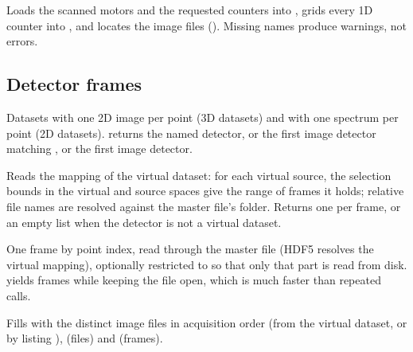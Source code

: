 Loads the scanned motors and the requested counters into , grids every 1D
counter into , and locates the image files (). Missing names
produce warnings, not errors.

\subsection{Detector frames}

Datasets with one 2D image per point (3D datasets) and with one spectrum per point (2D
datasets).  returns the named detector, or the first image detector
matching , or the first image detector.

Reads the mapping of the virtual dataset: for each virtual source, the selection bounds in
the virtual and source spaces give the range of frames it holds; relative file names are
resolved against the master file's folder. Returns one  per frame, or an
empty list when the detector is not a virtual dataset.

One frame by point index, read through the master file (HDF5 resolves the virtual mapping),
optionally restricted to  so that only that part is read
from disk.  yields frames while keeping the file open, which is much faster
than repeated  calls.

Fills  with the distinct image files in acquisition order (from the
virtual dataset, or by listing ),  (files) and
 (frames).

